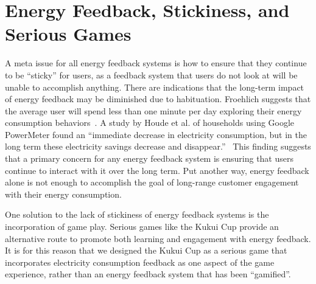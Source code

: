\documentclass[10pt, conference, compsocconf]{IEEEtran}
\begin{document}
%


\section{Energy Feedback, Stickiness, and Serious Games}

A meta issue for all energy feedback systems is how to ensure that they continue to be ``sticky'' for users, as a feedback system that users do not look at will be unable to accomplish anything. There are indications that the long-term impact of energy feedback may be diminished due to habituation. Froehlich suggests that the average user will spend less than one minute per day exploring their energy consumption behaviors~\cite{Froehlich2010-BECC}. A study by Houde et al. of households using Google PowerMeter found an ``immediate decrease in electricity consumption, but in the long term these electricity savings decrease and disappear.''~\cite{Houde2013-powermeter} This finding suggests that a primary concern for any energy feedback system is ensuring that users continue to interact with it over the long term. Put another way, energy feedback alone is not enough to accomplish the goal of long-range customer engagement with their energy consumption.

One solution to the lack of stickiness of energy feedback systems is the incorporation of game play. Serious games like the Kukui Cup provide an alternative route to promote both learning and engagement with energy feedback. It is for this reason that we designed the Kukui Cup as a serious game that incorporates electricity consumption feedback as one aspect of the game experience, rather than an energy feedback system that has been ``gamified''. 
\end{document}

